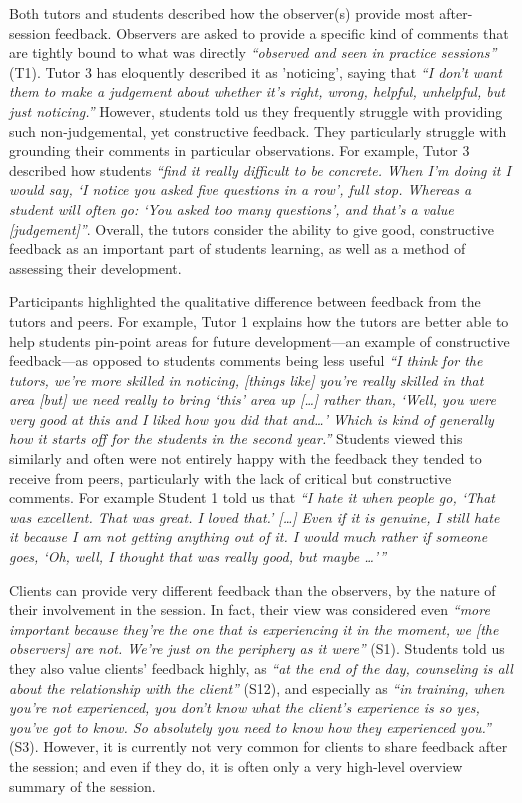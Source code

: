 \documentclass{sigchi}
\newcommand{\qq}[2]{\textrm{\textit{``#2''}}}
\begin{document}
Both tutors and students described how the observer(s) provide most after-session feedback. Observers are asked to provide a specific kind of comments that are tightly bound to what was directly \qq{}{observed and seen in practice sessions} (T1). Tutor 3 has eloquently described it as 'noticing', saying that \qq{}{I don't want them to make a judgement about whether it's right, wrong, helpful, unhelpful, but just noticing.} However, students told us they frequently struggle with providing such non-judgemental, yet constructive feedback. They particularly struggle with grounding their comments in particular observations. For example, Tutor 3 described how students \qq{}{find it really difficult to be concrete. When I'm doing it I would say, `I notice you asked five questions in a row', full stop.  Whereas a student will often go: `You asked too many questions', and that's a value [judgement]}. Overall, the tutors consider the ability to give good, constructive feedback as an important part of students learning, as well as a method of assessing their development.

\enlargethispage{\baselineskip}
Participants highlighted the qualitative difference between feedback from the tutors and peers. For example, Tutor 1 explains how the tutors are better able to help students pin-point areas for future development---an example of constructive feedback---as opposed to students comments being less useful \qq{}{I think for the tutors, we're more skilled in noticing, [things like] you're really skilled in that area [but] we need really to bring `this' area up [\dots] rather than, `Well, you were very good at this and I liked how you did that and…' Which is kind of generally how it starts off for the students in the second year.} Students viewed this similarly and often were not entirely happy with the feedback they tended to receive from peers, particularly with the lack of critical but constructive comments. For example Student 1 told us that \qq{Lily}{I hate it when people go, `That was excellent. That was great. I loved that.' [\dots] Even if it is genuine, I still hate it because I am not getting anything out of it. I would much rather if someone goes, `Oh, well, I thought that was really good, but maybe \dots'}

Clients can provide very different feedback than the observers, by the nature of their involvement in the session. In fact, their view was considered even \qq{}{more important because they're the one that is experiencing it in the moment, we [the observers] are not. We're just on the periphery as it were} (S1). Students told us they also value clients' feedback highly, as \qq{}{at the end of the day, counseling is all about the relationship with the client} (S12), and especially as \qq{}{in training, when you're not experienced, you don't know what the client's experience is so yes, you've got to know.  So absolutely you need to know how they experienced you.} (S3). However, it is currently not very common for clients to share feedback after the session; and even if they do, it is often only a very high-level overview summary of the session. 
\end{document}
